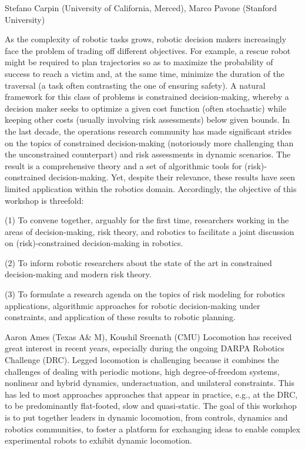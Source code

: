 \begin{spacing}{1.0}
{Stefano Carpin (University of California, Merced), Marco Pavone (Stanford University)}
{
As the complexity of robotic tasks grows, robotic decision makers increasingly face the problem of trading off different objectives. For example, a rescue robot might be required to plan trajectories so as to maximize the probability of success to reach a victim and, at the same time, minimize the duration of the traversal (a task often contrasting the one of ensuring safety). A natural framework for this class of problems is constrained decision-making, whereby a decision maker seeks to optimize a given cost function (often stochastic) while keeping other costs (usually involving risk assessments) below given bounds. In the last decade, the operations research community has made significant strides on the topics of constrained decision-making (notoriously more challenging than the unconstrained counterpart) and risk assessments in dynamic scenarios. The result is a comprehensive theory and a set of algorithmic tools for (risk)-constrained decision-making. Yet, despite their relevance, these results have seen limited application within the robotics domain. Accordingly, the objective of this workshop is threefold: 

(1) To convene together, arguably for the first time, researchers working in the areas of decision-making, risk theory, and robotics to facilitate a joint discussion on (risk)-constrained decision-making in robotics.  

(2) To inform robotic researchers about the state of the art in constrained decision-making and modern risk theory.

(3) To formulate a research agenda on the topics of risk modeling for robotics applications, algorithmic approaches for robotic decision-making under constraints, and application of these results to robotic planning.
}



{Aaron Ames (Texas A\& M), Koushil Sreenath (CMU)}
{
Locomotion has received great interest in recent years, especially during the ongoing DARPA Robotics Challenge (DRC).  Legged locomotion is challenging because it combines the challenges of dealing with periodic motions, high degree-of-freedom systems, nonlinear and hybrid dynamics, underactuation, and unilateral constraints.  This has led to most approaches approaches that appear in practice, e.g., at the DRC, to be predominantly flat-footed, slow and quasi-static.  The goal of this workshop is to put together leaders in dynamic locomotion, from controls, dynamics and robotics communities, to foster a platform for exchanging ideas to enable complex experimental robots to exhibit dynamic locomotion.
}




\end{spacing}
